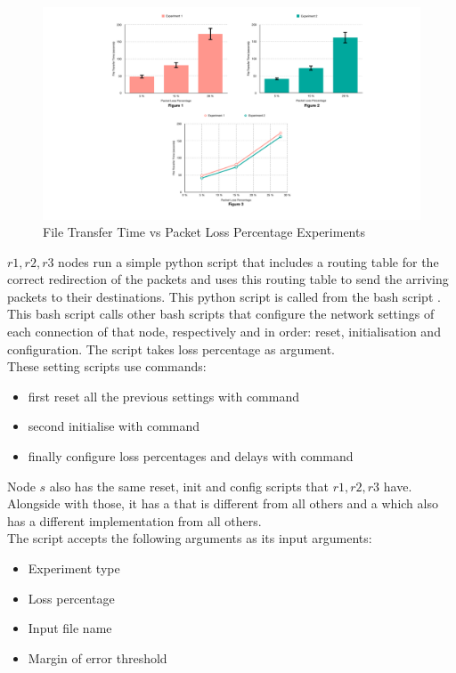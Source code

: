 \documentclass[conference]{IEEEtran}
\begin{document}
\begin{figure}[t]
\caption*{File Transfer Time vs Packet Loss Percentage Experiments}
\centerline{\includegraphics[width=\textwidth]{exps.pdf}}
\label{graph}
\end{figure}
        
    $r1,r2,r3$ nodes run a simple python script that includes a routing table for the correct redirection of the packets and uses this routing table to send the arriving packets to their destinations. This python script is called from the bash script . This bash script calls other bash scripts that configure the network settings of each connection of that node, respectively and in order: reset, initialisation and configuration. The script  takes loss percentage as argument.\\
    These setting scripts use  commands: 
    
    \begin{itemize}
        \item first reset all the previous settings with  command
        \item second initialise with  command
        \item finally configure loss percentages and delays with  command
    \end{itemize}
    
    Node $s$ also has the same reset, init and config scripts that $r1,r2,r3$ have. Alongside with those, it has a  that is different from all others and a  which also has a different implementation from all others. \\
    The script  accepts the following arguments as its input arguments: 
        \begin{itemize}
            \item Experiment type
            \item Loss percentage
            \item Input file name
            \item Margin of error threshold
        \end{itemize}
    
\end{document}
